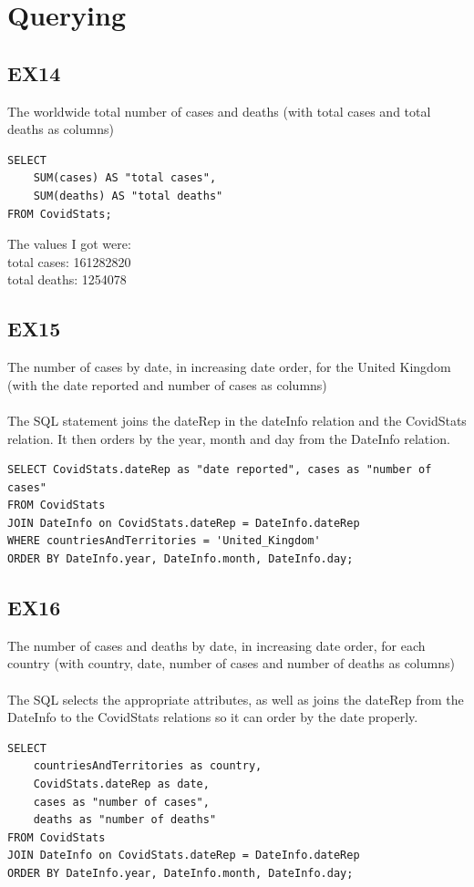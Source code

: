 \documentclass[]{article}
\begin{document}
\section{Querying}
\subsection{EX14}
The worldwide total number of cases and deaths (with total cases and total deaths as columns) 

\begin{verbatim}
SELECT
    SUM(cases) AS "total cases",
    SUM(deaths) AS "total deaths"
FROM CovidStats;
\end{verbatim}
The values I got were:\\
total cases: 161282820\\
total deaths: 1254078
\subsection{EX15}
The number of cases by date, in increasing date order, for the United Kingdom (with the date reported and number of cases as columns) \\
\\The SQL statement joins the dateRep in the dateInfo relation and the CovidStats relation. It then orders by the year, month and day from the DateInfo relation.

\begin{verbatim}
SELECT CovidStats.dateRep as "date reported", cases as "number of cases"
FROM CovidStats
JOIN DateInfo on CovidStats.dateRep = DateInfo.dateRep
WHERE countriesAndTerritories = 'United_Kingdom'
ORDER BY DateInfo.year, DateInfo.month, DateInfo.day;
\end{verbatim}

\subsection{EX16}
The number of cases and deaths by date, in increasing date order, for each country (with country, date, number of cases and number of deaths as columns)\\
\\The SQL selects the appropriate attributes, as well as joins the dateRep from the DateInfo to the CovidStats relations so it can order by the date properly.
\begin{verbatim}
SELECT
    countriesAndTerritories as country,
    CovidStats.dateRep as date,
    cases as "number of cases",
    deaths as "number of deaths"
FROM CovidStats
JOIN DateInfo on CovidStats.dateRep = DateInfo.dateRep
ORDER BY DateInfo.year, DateInfo.month, DateInfo.day;
\end{verbatim}
\end{document}
